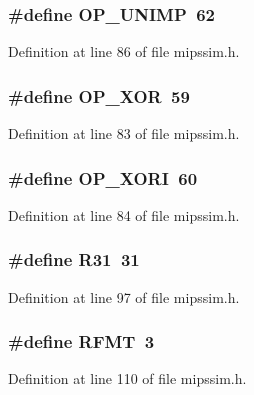 \subsubsection[{O\+P\+\_\+\+U\+N\+I\+MP}]{\setlength{\rightskip}{0pt plus 5cm}\#define O\+P\+\_\+\+U\+N\+I\+MP~62}\label{mipssim_8h_ae53c273b90e46b3ea02fed7fd161abb3}


Definition at line 86 of file mipssim.\+h.

\subsubsection[{O\+P\+\_\+\+X\+OR}]{\setlength{\rightskip}{0pt plus 5cm}\#define O\+P\+\_\+\+X\+OR~59}\label{mipssim_8h_aaf7ce11035df86913b327efb840ebd2a}


Definition at line 83 of file mipssim.\+h.

\subsubsection[{O\+P\+\_\+\+X\+O\+RI}]{\setlength{\rightskip}{0pt plus 5cm}\#define O\+P\+\_\+\+X\+O\+RI~60}\label{mipssim_8h_a6910816bfe0c2c208b91d1c430523adb}


Definition at line 84 of file mipssim.\+h.

\subsubsection[{R31}]{\setlength{\rightskip}{0pt plus 5cm}\#define R31~31}\label{mipssim_8h_a9ccd6c96c7835277efb7a281518a640e}


Definition at line 97 of file mipssim.\+h.

\subsubsection[{R\+F\+MT}]{\setlength{\rightskip}{0pt plus 5cm}\#define R\+F\+MT~3}\label{mipssim_8h_aee90139ab3e806c5eec049396e821143}


Definition at line 110 of file mipssim.\+h.

